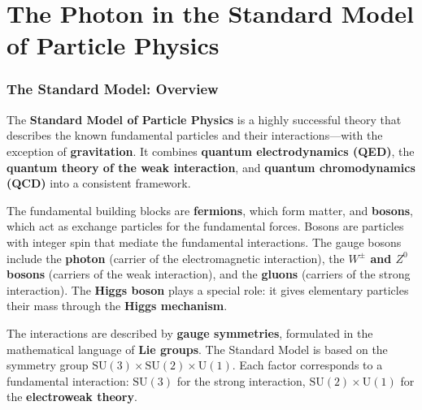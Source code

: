 \chapter{The Photon in the Standard Model of Particle Physics}
\setcounter{section}{8}
\setcounter{subsection}{0}
\setcounter{subsubsection}{1}
\setcounter{secnumdepth}{3}

\subsection{The Standard Model: Overview}

The \textbf{Standard Model of Particle Physics} is a highly successful theory that describes the known fundamental particles and their interactions—with the exception of \textbf{gravitation}.  
It combines \textbf{quantum electrodynamics (QED)}, the \textbf{quantum theory of the weak interaction}, and \textbf{quantum chromodynamics (QCD)} into a consistent framework.

The fundamental building blocks are \textbf{fermions}, which form matter, and \textbf{bosons}, which act as exchange particles for the fundamental forces.  
Bosons are particles with integer spin that mediate the fundamental interactions.  
The gauge bosons include the \textbf{photon} (carrier of the electromagnetic interaction), the \textbf{$W^\pm$ and $Z^0$ bosons} (carriers of the weak interaction), and the \textbf{gluons} (carriers of the strong interaction).  
The \textbf{Higgs boson} plays a special role: it gives elementary particles their mass through the \textbf{Higgs mechanism}.

The interactions are described by \textbf{gauge symmetries}, formulated in the mathematical language of \textbf{Lie groups}.  
The Standard Model is based on the symmetry group \(\mathrm{SU(3)} \times \mathrm{SU(2)} \times \mathrm{U(1)}\).  
Each factor corresponds to a fundamental interaction:  
\(\mathrm{SU(3)}\) for the strong interaction, \(\mathrm{SU(2)} \times \mathrm{U(1)}\) for the \textbf{electroweak theory}.

